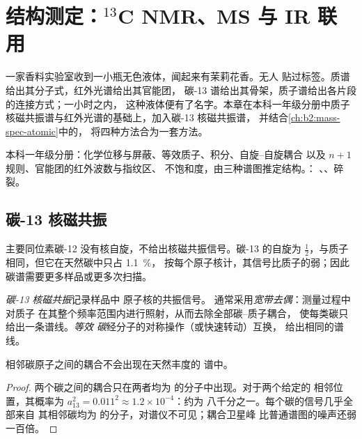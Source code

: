 \chapter{结构测定：\texorpdfstring{$^{13}$C}{13C} NMR、MS 与 IR 联用}\label{ch:b2:structure-determination}

一家香料实验室收到一小瓶无色液体，闻起来有茉莉花香。无人
贴过标签。质谱给出其分子式，红外光谱给出其官能团，
碳-13 谱给出其骨架，质子谱给出各片段的连接方式；一小时之内，
这种液体便有了名字。本章在本科一年级分册中质子核磁共振谱与红外光谱的基础上，加入碳-13 核磁共振谱，
并结合\cref{ch:b2:mass-spec-atomic}中的，
将四种方法合为一套方法。

\begin{recall}
本科一年级分册：化学位移与屏蔽、等效质子、积分、自旋–自旋耦合
以及 $n + 1$ 规则、官能团的红外波数与指纹区、
不饱和度，由三种谱图推定结构。：
、、碎裂。
\end{recall}

\section{碳-13 核磁共振}

主要同位素碳-12 没有核自旋，不给出核磁共振信号。碳-13 的自旋为
$\tfrac12$，与质子相同，但它在天然碳中只占 1.1~\%，
按每个原子核计，其信号比质子的弱；因此碳谱需要更多样品或更多次扫描。

\begin{definition}[碳-13 核磁共振]\label{def:b2:structure-determination:c13}
\emph{碳-13 核磁共振}记录样品中  原子核的共振信号。
通常采用\emph{宽带去偶}：测量过程中对质子
在其整个频率范围内进行照射，从而去除全部碳–质子耦合，
使每类碳只给出一条谱线。\emph{等效
碳}经分子的对称操作（或快速转动）互换，
给出相同的谱线。
\end{definition}

\begin{proposition}[无碳–碳耦合]\label{prop:b2:structure-determination:no-cc-coupling}
相邻碳原子之间的耦合不会出现在天然丰度的
 谱中。
\end{proposition}

\begin{proof}
两个碳之间的耦合只在两者均为  的分子中出现。对于两个给定的
相邻位置，其概率为 $a_{13}^2 = 0.011^2 \approx 1.2 \times 10^{-4}$：约为
八千分之一。每个碳的信号几乎全部来自
其相邻碳均为  的分子，对谱仪不可见；耦合卫星峰
比普通谱图的噪声还弱一百倍。
\end{proof}

